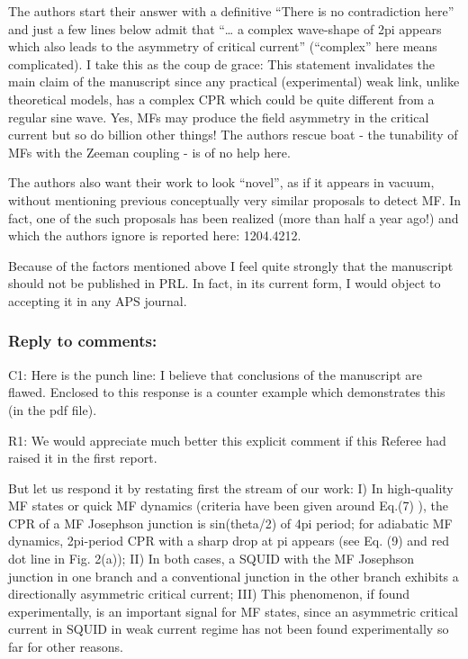 \documentclass[11pt]{article}
\begin{document}
The authors start their answer with a definitive ``There is no
contradiction here'' and just a few lines below admit that ``\ldots{} a
complex wave-shape of 2pi appears which also leads to the asymmetry of
critical current'' (``complex'' here means complicated). I take this as
the coup de grace: This statement invalidates the main claim of the
manuscript since any practical (experimental) weak link, unlike
theoretical models, has a complex CPR which could be quite different
from a regular sine wave. Yes, MFs may produce the field asymmetry in
the critical current but so do billion other things! The authors rescue
boat - the tunability of MFs with the Zeeman coupling - is of no help
here.

The authors also want their work to look ``novel'', as if it appears in
vacuum, without mentioning previous conceptually very similar proposals
to detect MF. In fact, one of the such proposals has been realized (more
than half a year ago!) and which the authors ignore is reported here:
1204.4212.

Because of the factors mentioned above I feel quite strongly that the
manuscript should not be published in PRL. In fact, in its current form,
I would object to accepting it in any APS journal.

\hypertarget{reply-to-comments}{%
\subsubsection{Reply to comments:}\label{reply-to-comments}}

C1: Here is the punch line: I believe that conclusions of the manuscript
are flawed. Enclosed to this response is a counter example which
demonstrates this (in the pdf file).

R1: We would appreciate much better this explicit comment if this
Referee had raised it in the first report.

But let us respond it by restating first the stream of our work: I) In
high-quality MF states or quick MF dynamics (criteria have been given
around Eq.(7) ), the CPR of a MF Josephson junction is sin(theta/2) of
4pi period; for adiabatic MF dynamics, 2pi-period CPR with a sharp drop
at pi appears (see Eq. (9) and red dot line in Fig. 2(a)); II) In both
cases, a SQUID with the MF Josephson junction in one branch and a
conventional junction in the other branch exhibits a directionally
asymmetric critical current; III) This phenomenon, if found
experimentally, is an important signal for MF states, since an
asymmetric critical current in SQUID in weak current regime has not been
found experimentally so far for other reasons.
\end{document}
